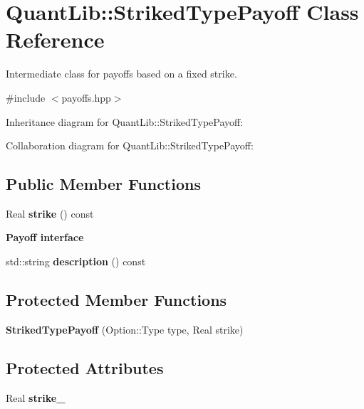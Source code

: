 \section{Quant\+Lib\+:\+:Striked\+Type\+Payoff Class Reference}
\label{class_quant_lib_1_1_striked_type_payoff}


Intermediate class for payoffs based on a fixed strike.  




{\ttfamily \#include $<$payoffs.\+hpp$>$}



Inheritance diagram for Quant\+Lib\+:\+:Striked\+Type\+Payoff\+:


Collaboration diagram for Quant\+Lib\+:\+:Striked\+Type\+Payoff\+:
\subsection*{Public Member Functions}
\begin{DoxyCompactItemize}
\item 
Real {\bfseries strike} () const \label{class_quant_lib_1_1_striked_type_payoff_a7727579392d03ca9b759cadf45818127}

\end{DoxyCompactItemize}
\begin{Indent}{\bf Payoff interface}\par
\begin{DoxyCompactItemize}
\item 
std\+::string {\bfseries description} () const \label{class_quant_lib_1_1_striked_type_payoff_ad22f3f9175be28aca6acea081c81de75}

\end{DoxyCompactItemize}
\end{Indent}
\subsection*{Protected Member Functions}
\begin{DoxyCompactItemize}
\item 
{\bfseries Striked\+Type\+Payoff} (Option\+::\+Type type, Real strike)\label{class_quant_lib_1_1_striked_type_payoff_a68f84b64d373d6e9cf49e0fb633880d3}

\end{DoxyCompactItemize}
\subsection*{Protected Attributes}
\begin{DoxyCompactItemize}
\item 
Real {\bfseries strike\+\_\+}\label{class_quant_lib_1_1_striked_type_payoff_a1a8dfb6b6f557d30b497ef63a92e12d0}

\end{DoxyCompactItemize}


